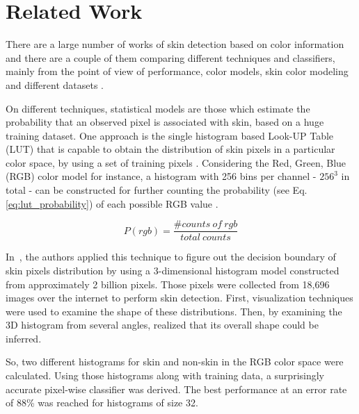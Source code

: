 \chapter{Related Work}
\label{cap:related-work}

There are a large number of works of skin detection based on color information and there are a couple of them comparing different techniques and classifiers, mainly from the point of view of performance, color models, skin color modeling and different datasets \citep{vezhnevets:03,kakumanu:07,mahmoodi:16}.

On different techniques, statistical models are those which estimate the probability that an observed pixel is associated with skin, based on a huge training dataset. One approach is the single histogram based Look-UP Table (LUT) that is capable to obtain the distribution of skin pixels in a particular color space, by using a set of training pixels \citep{mahmoodi:16}. Considering the Red, Green, Blue (RGB) color model for instance, a histogram with 256 bins per channel - $256^3$ in total - can be constructed for further counting the probability (see Eq. \ref{eq:lut_probability}) of each possible RGB value \citep{jones:02}.

\begin{equation*}
    P(rgb) = \frac{\# counts~of~rgb}{total~counts}
    \label{eq:lut_probability}
\end{equation*}

In~\citet{jones:02}, the authors applied this technique to figure out the decision boundary of skin pixels distribution by using a $3$-dimensional histogram model constructed from approximately 2 billion pixels. Those pixels were collected from 18,696 images over the internet to perform skin detection. First, visualization techniques were used to examine the shape of these distributions. Then, by examining the 3D histogram from several angles, \citet{jones:02} realized that its overall shape could be inferred.

So, two different histograms for skin and non-skin in the RGB color space were calculated. Using those histograms along with training data, a surprisingly accurate pixel-wise classifier was derived. The best performance at an error rate of 88\% was reached for histograms of size 32.

